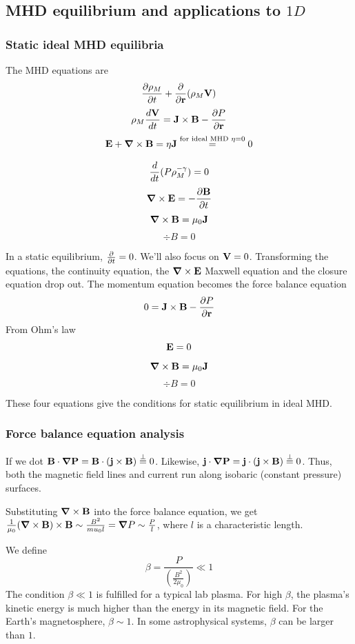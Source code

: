 \documentclass[PlasmaNotes.tex]{subfiles}
\begin{document}
\subsection{MHD equilibrium and applications to $1D$}

\subsubsection{Static ideal MHD equilibria}
The MHD equations are
\[ \frac{\partial \rho_M}{\partial t} + \frac{\partial }{\partial \mathbf{r}}(\rho_M \mathbf{V}) \]
\[ \rho_M \frac{d \mathbf{V}}{d t} = \mathbf{J} \times \mathbf{B} - \frac{\partial P}{\partial \mathbf{r}} \]
\[ \mathbf{E} + \mbox{\boldmath$ \nabla $} \times \mathbf{B} = \eta \mathbf{J} \stackrel{\text{for ideal MHD } \eta = 0}{=} 0 \]
\begin{center}
\end{center}
\[ \frac{d }{d t} (P \rho_M^{-\gamma})=0 \]
\[\mbox{\boldmath$ \nabla $} \times \mathbf{E} = -\frac{\partial \mathbf{B}}{\partial t} \]
\[ \mbox{\boldmath$ \nabla $} \times \mathbf{B} = \mu_0 \mathbf{J} \]
\[ \div{B} = 0 \]

In a static equilibrium, $\frac{\partial }{\partial t} =0$. We'll also focus on $\mathbf{V}=0$. Transforming the equations, the continuity equation, the $\mbox{\boldmath$ \nabla $} \times \mathbf{E}$ Maxwell equation and the closure equation drop out. The momentum equation becomes the force balance equation
\[ 0 = \mathbf{J} \times \mathbf{B} - \frac{\partial P}{\partial \mathbf{r}} \]
From Ohm's law
\[ \mathbf{E} = 0 \]
\[ \mbox{\boldmath$ \nabla $} \times \mathbf{B} = \mu_0 \mathbf{J} \]
\[ \div{B} = 0 \]

These four equations give the conditions for static equilibrium in ideal MHD.

\subsubsection{Force balance equation analysis}
If we dot $\mathbf{B} \cdot \mathbf{\mbox{\boldmath$ \nabla $} P} = \mathbf{B} \cdot \mathbf{(\mathbf{j} \times \mathbf{B})} \stackrel{\perp}{=} 0$. Likewise, $\mathbf{j} \cdot \mathbf{\mbox{\boldmath$ \nabla $} P} = \mathbf{j} \cdot \mathbf{(\mathbf{j} \times \mathbf{B})} \stackrel{\perp}{=} 0$. Thus, both the magnetic field lines and current run along isobaric (constant pressure) surfaces.

Substituting $\mbox{\boldmath$ \nabla $} \times \mathbf{B}$ into the force balance equation, we get
$\frac{1}{\mu_0} \mathbf{(\mbox{\boldmath$ \nabla $} \times \mathbf{B})} \times \mathbf{B} \sim \frac{B^2}{mu_0 l} = \mbox{\boldmath$ \nabla $} P \sim \frac{P}{l}$, where $l$ is a characteristic length.

We define
\begin{equation}
\boxed{\beta = \frac{P}{(\frac{B^2}{2\mu_0})} \ll 1 }
\end{equation}
The condition $\beta \ll 1$ is fulfilled for a typical lab plasma. For high $\beta$, the plasma's kinetic energy is much higher than the energy in its magnetic field. For the Earth's magnetosphere, $\beta \sim 1$. In some astrophysical systems, $\beta$ can be larger than $1$.
\end{document}
